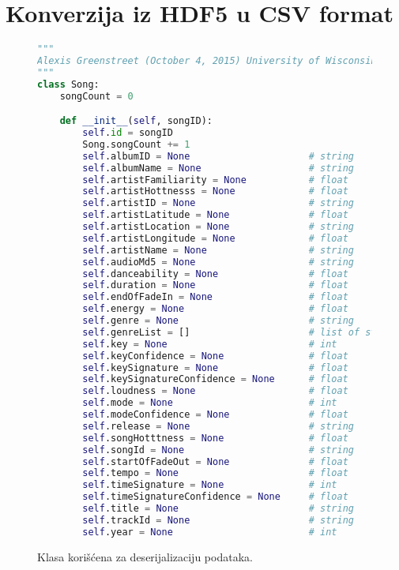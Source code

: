 \section{Konverzija iz HDF5 u CSV format}
\label{sec:DodatakIzvlacenje}

\begin{figure}[h]
\lstset{style=mystyle}
\begin{lstlisting}[language=Python, basicstyle=\footnotesize]
"""
Alexis Greenstreet (October 4, 2015) University of Wisconsin-Madison
"""
class Song:
    songCount = 0

    def __init__(self, songID):
        self.id = songID
        Song.songCount += 1
        self.albumID = None                     # string
        self.albumName = None                   # string
        self.artistFamiliarity = None           # float
        self.artistHottnesss = None             # float
        self.artistID = None                    # string
        self.artistLatitude = None              # float
        self.artistLocation = None              # string
        self.artistLongitude = None             # float
        self.artistName = None                  # string
        self.audioMd5 = None                    # string
        self.danceability = None                # float
        self.duration = None                    # float
        self.endOfFadeIn = None                 # float
        self.energy = None                      # float
        self.genre = None                       # string
        self.genreList = []                     # list of strings
        self.key = None                         # int
        self.keyConfidence = None               # float
        self.keySignature = None                # float
        self.keySignatureConfidence = None      # float
        self.loudness = None                    # float
        self.mode = None                        # int
        self.modeConfidence = None              # float
        self.release = None                     # string
        self.songHotttness = None               # float
        self.songId = None                      # string
        self.startOfFadeOut = None              # float
        self.tempo = None                       # float
        self.timeSignature = None               # int
        self.timeSignatureConfidence = None     # float
        self.title = None                       # string
        self.trackId = None                     # string
        self.year = None                        # int
\end{lstlisting}
\label{code:SongClass}
\caption{Klasa kori\v{s}\'c{}ena za deserijalizaciju podataka.}
\end{figure}

